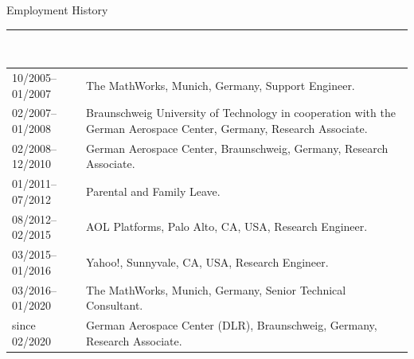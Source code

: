 \bigskip
\large Employment History\\[-8pt]
\noindent\rule{15.25cm}{0.4pt}\\[3pt]
\normalsize
\begin{tabular}{@{}p{3.2cm}p{11.3cm}@{}}
    10/2005--01/2007 & The MathWorks, Munich, Germany, %
    Support Engineer. \\[5pt]
    02/2007--01/2008 &  Braunschweig University of Technology in cooperation with the German Aerospace Center, Germany, %
    Research Associate. \\[13pt]
    02/2008--12/2010 & German Aerospace Center, Braunschweig, Germany, %
    Research Associate. \\[13pt]
    01/2011--07/2012 & Parental and Family Leave. \\[5pt]
    08/2012--02/2015 & AOL Platforms, Palo Alto, CA, USA, %
    Research Engineer. \\[7pt]
    03/2015--01/2016 & Yahoo!, Sunnyvale, CA, USA, %
    Research Engineer. \\[5pt]
    03/2016--01/2020 & The MathWorks, Munich, Germany, %
    Senior Technical Consultant. \\[5pt]
    since 02/2020 & German Aerospace Center (DLR), Braunschweig, Germany, %
    Research Associate. \\
\end{tabular}